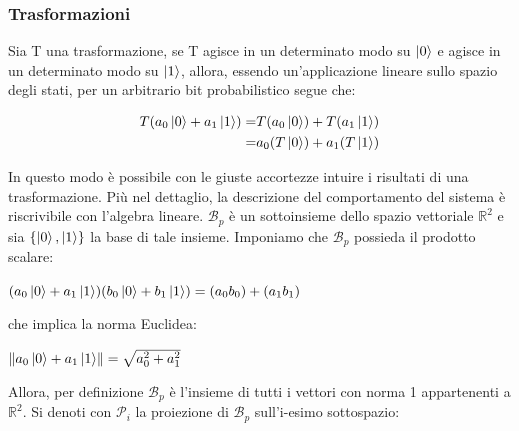 \documentclass[12pt,a4paper,openright]{report}
\newcommand{\norm}[1]{\left\lVert#1\right\rVert}
\begin{document}
\subsubsection{Trasformazioni}
Sia T una trasformazione, se T agisce in un determinato modo su $\ket0$
e agisce in un determinato modo su $\ket1$, allora, essendo un'applicazione lineare sullo spazio degli stati, per un arbitrario bit probabilistico segue che:
\begin{center}
    \begin{align*}
        T(a_0\ket0 + a_1\ket1)=& T(a_0\ket0) + T(a_1\ket1)\\ =& a_0(T\ket0) + a_1(T\ket1)
    \end{align*}
\end{center}
In questo modo è possibile con le giuste accortezze intuire i risultati di una trasformazione. Più nel dettaglio, la descrizione 
del comportamento del sistema è riscrivibile con l'algebra lineare.
$\mathcal{B}_p$ è un sottoinsieme dello spazio vettoriale ${\mathbb{R}^2}$ e sia $\{\ket0,\ket1 \}$ la base di tale insieme. Imponiamo che $\mathcal{B}_p$
possieda il prodotto scalare:
\begin{center}
    $(a_0\ket0 + a_1\ket1)(b_0\ket0 + b_1\ket1) = (a_0b_0) + (a_1b_1)$
\end{center}
che implica la norma Euclidea:
\begin{center}
    $\norm{a_0\ket0 + a_1\ket1}=\sqrt{a_0^2+a_1^2}$
\end{center}
Allora, per definizione $\mathcal{B}_p$ è l'insieme di tutti i vettori con norma 1 appartenenti a ${\mathbb{R}^2}$. Si denoti con $\mathcal{P}_i$ la proiezione
di $\mathcal{B}_p$ sull'i-esimo sottospazio:
    
\end{document}
